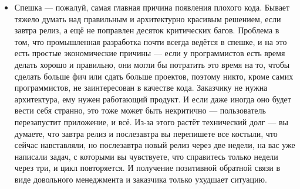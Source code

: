 \documentclass[a5paper]{article}
\begin{document}
\begin{itemize}
	\item Спешка --- пожалуй, самая главная причина появления плохого кода. Бывает тяжело думать над правильным и архитектурно красивым решением, если завтра релиз, а ещё не поправлен десяток критических багов. Проблема в том, что промышленная разработка почти всегда ведётся в спешке, и на это есть простые экономические причины --- если у программистов есть время делать хорошо и правильно, они могли бы потратить это время на то, чтобы сделать больше фич или сдать больше проектов, поэтому никто, кроме самих программистов, не заинтересован в качестве кода. Заказчику не нужна архитектура, ему нужен работающий продукт. И если даже иногда оно будет вести себя странно, это тоже может быть некритично --- пользователь перезапустит приложение, и всё. Из-за этого растёт технический долг --- вы думаете, что завтра релиз и послезавтра вы перепишете все костыли, что сейчас навставляли, но послезавтра новый релиз через две недели, на вас уже написали задач, с которыми вы чувствуете, что справитесь только недели через три, и цикл повторяется. И получение позитивной обратной связи в виде довольного менеджмента и заказчика только ухудшает ситуацию.
\end{itemize}
\end{document}
